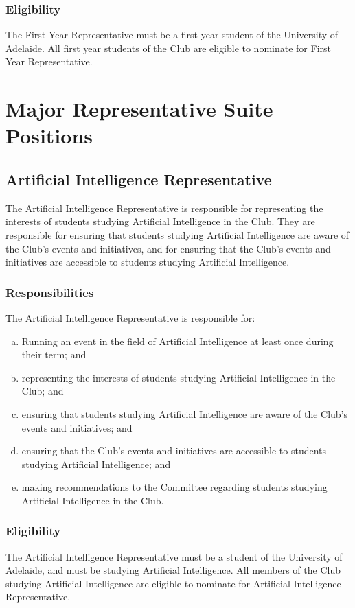 \documentclass[11pt]{report}
\begin{document}
\subsection{Eligibility}
The First Year Representative must be a first year student of the University of Adelaide. All first year students of the Club are eligible to nominate for First Year Representative.

\chapter{Major Representative Suite Positions}
\section{Artificial Intelligence Representative}
The Artificial Intelligence Representative is responsible for representing the interests of students studying Artificial Intelligence in the Club. They are responsible for ensuring that students studying Artificial Intelligence are aware of the Club's events and initiatives, and for ensuring that the Club's events and initiatives are accessible to students studying Artificial Intelligence.
\subsection{Responsibilities}
The Artificial Intelligence Representative is responsible for:
\begin{enumerate}[(a)]
    \item Running an event in the field of Artificial Intelligence at least once during their term; and
    \item representing the interests of students studying Artificial Intelligence in the Club; and
    \item ensuring that students studying Artificial Intelligence are aware of the Club's events and initiatives; and
    \item ensuring that the Club's events and initiatives are accessible to students studying Artificial Intelligence; and
    \item making recommendations to the Committee regarding students studying Artificial Intelligence in the Club.
\end{enumerate}
\subsection{Eligibility}
The Artificial Intelligence Representative must be a student of the University of Adelaide, and must be studying Artificial Intelligence. All members of the Club studying Artificial Intelligence are eligible to nominate for Artificial Intelligence Representative.
\end{document}
